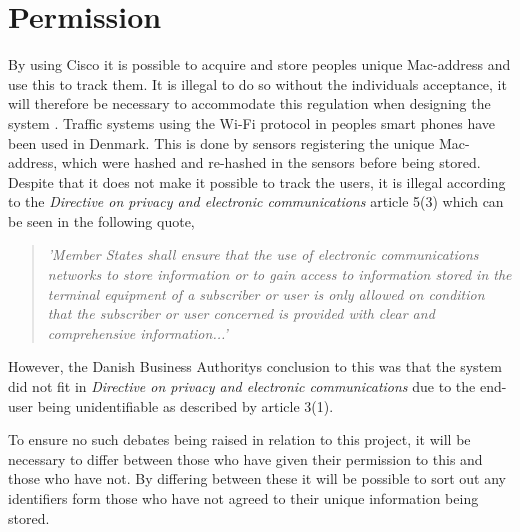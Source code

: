 \section{Permission} \label{sec:permission}
By using Cisco it is possible to acquire and store peoples unique Mac-address and use this to track them. It is illegal to do so without the individuals acceptance, it will therefore be necessary to accommodate this regulation when designing the system \cite{TrafficIlligal}.
Traffic systems using the Wi-Fi protocol in peoples smart phones have been used in Denmark. This is done by sensors registering the unique Mac-address, which were hashed and re-hashed in the sensors before being stored. Despite that it does not make it possible to track the users\cite{TrafficIlligal}, it is illegal according to the \textit{Directive on privacy and electronic communications} article 5(3)\cite{CookieDirective} which can be seen in the following quote,

\begin{quote}
\textit{'Member States shall ensure that the use of electronic communications networks to store information or to gain access to information stored in the terminal equipment of a subscriber or user is only allowed on condition that the subscriber or user concerned is provided with clear and comprehensive information...'}
\end{quote}

However, the Danish Business Authoritys conclusion to this was that the system did not fit in \textit{Directive on privacy and electronic communications} due to the end-user being unidentifiable\cite{TrafficOK} as described by article 3(1)\cite{CookieDirective}.

To ensure no such debates being raised in relation to this project, it will be necessary to differ between those who have given their permission to this and those who have not. By differing between these it will be possible to sort out any identifiers form those who have not agreed to their unique information being stored.
